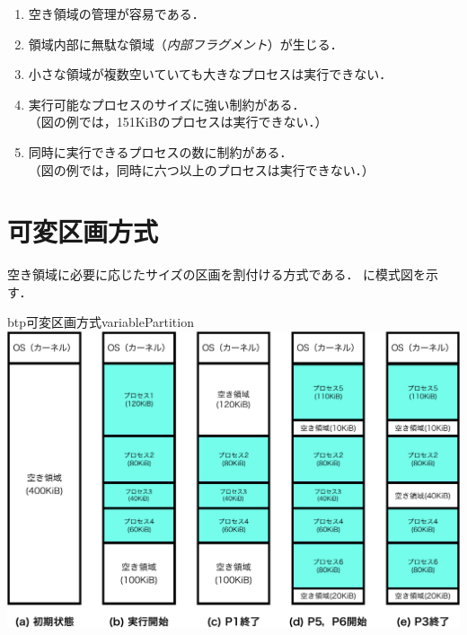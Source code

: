 \begin{enumerate}
\item 空き領域の管理が容易である．
\item 領域内部に無駄な領域（\emph{内部フラグメント}）が生じる．
\item 小さな領域が複数空いていても大きなプロセスは実行できない．
\item 実行可能なプロセスのサイズに強い制約がある．\\
  （図の例では，151KiBのプロセスは実行できない．）
\item 同時に実行できるプロセスの数に制約がある．\\
  （図の例では，同時に六つ以上のプロセスは実行できない．）
\end{enumerate}

\section{可変区画方式}
空き領域に必要に応じたサイズの区画を割付ける方式である．
に模式図を示す．

\begin{myfig}{btp}{可変区画方式}{variablePartition}
  \includegraphics[scale=0.66]{Fig/variablePartition-crop.pdf}
\end{myfig}

